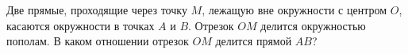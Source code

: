 \begin{ex}
	\begin{condition}
		Две прямые, проходящие через точку \( M  \), лежащую вне окружности с центром \( O \), касаются окружности в точках \( A \)	и \( B \). Отрезок \( OM  \) делится окружностью пополам. В каком отношении отрезок \( OM  \) делится прямой \( AB \)?
	\end{condition}
\end{ex}